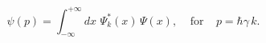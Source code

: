 \begin{equation}\label{p-Q}
\psi(p) =\int_{-\infty}^{+\infty} dx\,\, 
\Psi_k^*(x)\,\Psi(x),~~~~~\mbox{for}~~~~~
 p=\hbar\gamma \,k.
\end{equation}

